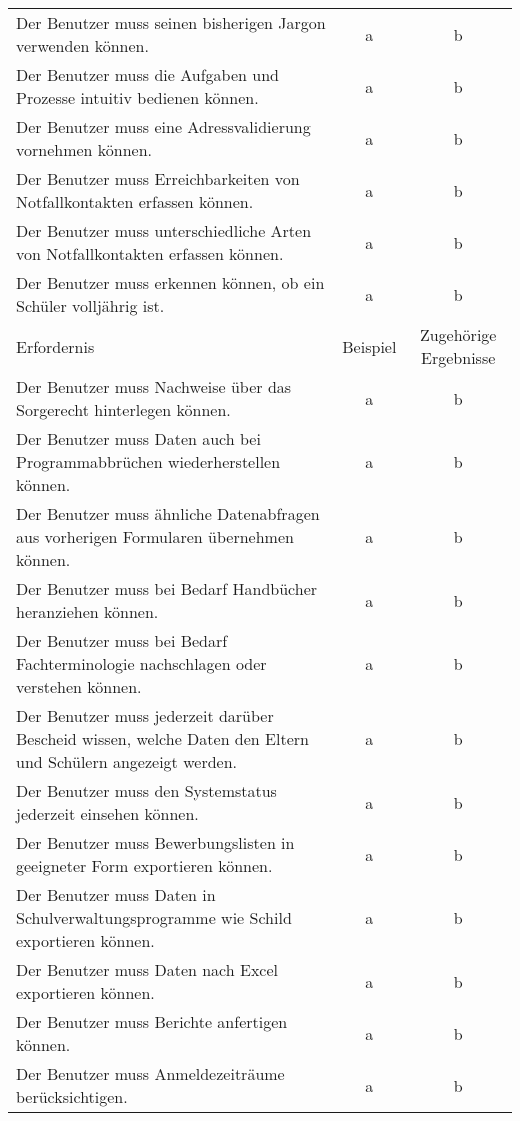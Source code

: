 \begin{landscape}
\begin{longtable}{p{15cm}cc}
            Der Benutzer muss seinen bisherigen Jargon verwenden können. & a & b \\
            Der Benutzer muss die Aufgaben und Prozesse intuitiv bedienen können. & a & b \\
            Der Benutzer muss eine Adressvalidierung vornehmen können. & a & b \\
            Der Benutzer muss Erreichbarkeiten von Notfallkontakten erfassen können. & a & b \\
            Der Benutzer muss unterschiedliche Arten von Notfallkontakten erfassen können. & a & b \\
            Der Benutzer muss erkennen können, ob ein Schüler volljährig ist. & a & b \\
        \endfirsthead
        \toprule
        Erfordernis & Beispiel & Zugehörige Ergebnisse \\
        \midrule
        \endhead
        \bottomrule
        \endfoot
            Der Benutzer muss Nachweise über das Sorgerecht hinterlegen können. & a & b \\
            Der Benutzer muss Daten auch bei Programmabbrüchen wiederherstellen können. & a & b \\
            Der Benutzer muss ähnliche Datenabfragen aus vorherigen Formularen übernehmen können. & a & b \\
            Der Benutzer muss bei Bedarf Handbücher heranziehen können. & a & b \\
            Der Benutzer muss bei Bedarf Fachterminologie nachschlagen oder verstehen können. & a & b \\
            Der Benutzer muss jederzeit darüber Bescheid wissen, welche Daten den Eltern und Schülern angezeigt werden. & a & b \\
            Der Benutzer muss den Systemstatus jederzeit einsehen können. & a & b \\
            Der Benutzer muss Bewerbungslisten in geeigneter Form exportieren können. & a & b \\
            Der Benutzer muss Daten in Schulverwaltungsprogramme wie Schild exportieren können. & a & b \\
            Der Benutzer muss Daten nach Excel exportieren können. & a & b \\
            Der Benutzer muss Berichte anfertigen können. & a & b \\
            Der Benutzer muss Anmeldezeiträume berücksichtigen. & a & b \\

\end{longtable}
\end{landscape}
